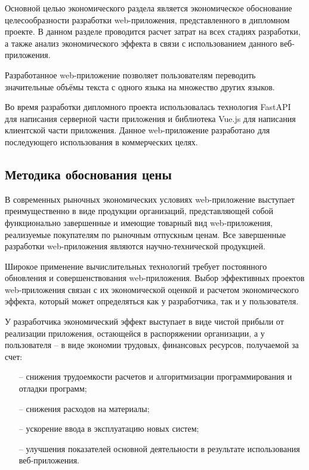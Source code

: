 \documentclass[14pt]{extarticle}
\begin{document}
Основной целью экономического раздела является экономическое обоснование целесообразности разработки web-приложения, представленного в дипломном проекте. В данном разделе проводится расчет затрат на всех стадиях разработки, а также анализ экономического эффекта в связи с использованием данного веб-приложения.

Разработанное web-приложение позволяет пользователям переводить значительные объёмы текста с одного языка на множество других языков.

Во время разработки дипломного проекта использовалась технология FastAPI для написания серверной части приложения и библиотека Vue.js для написания клиентской части приложения. Данное web-приложение разработано для последующего использования в коммерческих целях.

\subsection{Методика обоснования цены}

В современных рыночных экономических условиях web-приложение выступает преимущественно в виде продукции организаций, представляющей собой функционально завершенные и имеющие товарный вид web-приложения, реализуемые покупателям по рыночным отпускным ценам. Все завершенные разработки web-приложения являются научно-технической продукцией.

Широкое применение вычислительных технологий требует постоянного обновления и совершенствования web-приложения. Выбор эффективных проектов web-приложения связан с их экономической оценкой и расчетом экономического эффекта, который может определяться как у разработчика, так и у пользователя.

У разработчика экономический эффект выступает в виде чистой прибыли от реализации приложения, остающейся в распоряжении организации, а у пользователя – в виде экономии трудовых, финансовых ресурсов, получаемой за счет:
\begin{itemize}
    \item[--] снижения трудоемкости расчетов и алгоритмизации программирования и отладки программ;
    \item[--] снижения расходов на материалы;
    \item[--] ускорение ввода в эксплуатацию новых систем;
    \item[--] улучшения показателей основной деятельности в результате использования веб-приложения.
\end{itemize}
\end{document}
